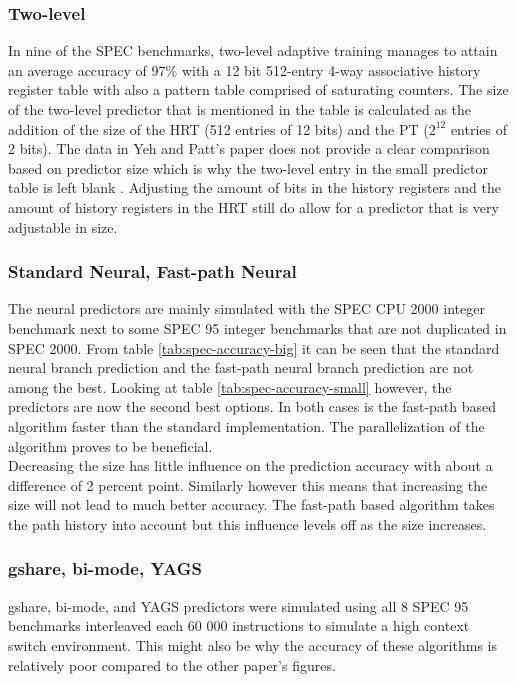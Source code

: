 \subsubsection*{Two-level}
In nine of the SPEC benchmarks, two-level adaptive training manages to attain an average accuracy of 97\% with a 12 bit 512-entry 4-way associative history register table with also a pattern table comprised of saturating counters. 
The size of the two-level predictor that is mentioned in the table is calculated as the addition of the size of the HRT (512 entries of 12 bits) and the PT ($2^{12}$ entries of 2 bits). 
The data in Yeh and Patt's paper does not provide a clear comparison based on predictor size which is why the two-level entry in the small predictor table is left blank \cite{twolevel}. 
Adjusting the amount of bits in the history registers and the amount of history registers in the HRT still do allow for a predictor that is very adjustable in size.

\subsubsection*{Standard Neural, Fast-path Neural}
The neural predictors are mainly simulated with the SPEC CPU 2000 integer benchmark next to some SPEC 95 integer benchmarks that are not duplicated in SPEC 2000. From table \ref{tab:spec-accuracy-big} it can be seen that the standard neural branch prediction and the fast-path neural branch prediction are not among the best. Looking at table \ref{tab:spec-accuracy-small} however, the predictors are now the second best options. In both cases is the fast-path based algorithm faster than the standard implementation. The parallelization of the algorithm proves to be beneficial. \\
Decreasing the size has little influence on the prediction accuracy with about a difference of 2 percent point. Similarly however this means that increasing the size will not lead to much better accuracy. The fast-path based algorithm takes the path history into account but this influence levels off as the size increases.

\subsubsection*{gshare, bi-mode, YAGS}
gshare, bi-mode, and YAGS predictors were simulated using all 8 SPEC 95 benchmarks interleaved each 60 000 instructions to simulate a high context switch environment. 
This might also be why the accuracy of these algorithms is relatively poor compared to the other paper's figures.

